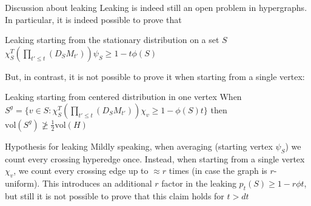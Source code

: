 \documentclass[../main.tex]{subfiles}
\begin{document}
    \begin{frame}{Discussion about leaking}         
        Leaking is indeed still an open problem in hypergraphs. In particular, it is indeed possible to prove that 
        \begin{block}{Leaking starting from the stationary distribution on a set $S$}
			$\chi_S^T(\prod_{t'\leq t}(D_S M_{t'})) \psi_S \geq 1 - t\phi(S)$
        \end{block}
    
    	But, in contrast, it is not possible to prove it when starting from a single vertex:
    	
    	\begin{block}{Leaking starting from centered distribution in one vertex}
			When $S^g = \{v\in S: \chi_S^T (\prod_{t'\leq t}(D_S M_{t'})) \chi_v \geq 1-\phi(S) t\}$ then $\text{vol}(S^g) \ngeq \frac{1}{2}\text{vol}(H)$ 
    	\end{block}
    \end{frame}
	
	\begin{frame}{Hypothesis for leaking}
		Mildly speaking, when averaging (starting vertex $\psi_S$) we count every crossing hyperedge once. Instead, when starting from a single vertex $\chi_v$, we count every crossing edge up to $\approx r$ times (in case the graph is $r$-uniform). This introduces an additional $r$ factor in the leaking $p_t(S) \geq 1-r\phi t$, but still it is not possible to prove that this claim holds for $t>dt$	\end{frame}
\end{document}
